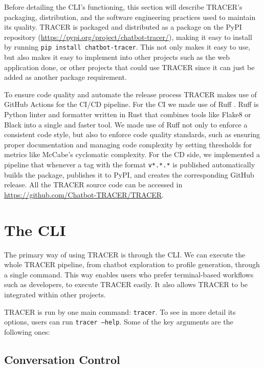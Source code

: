 Before detailing the \ac{CLI}'s functioning,
this section will describe \ac{TRACER}'s packaging, distribution,
and the software engineering practices used to maintain its quality.
\ac{TRACER} is packaged and distributed as a package on the \acf{PyPI} repository
(\url{https://pypi.org/project/chatbot-tracer/}),
making it easy to install by running
\texttt{pip install chatbot-tracer}.
This not only makes it easy to use,
but also makes it easy to implement into other projects
such as the web application done,
or other projects that could use \ac{TRACER}
since it can just be added as another package requirement.

To ensure code quality and automate the release process
\ac{TRACER} makes use of GitHub Actions for the \ac{CI/CD} pipeline.
For the \ac{CI} we made use of Ruff \autocite{Ruff}.
Ruff is Python linter and formatter written in Rust
that combines tools like Flake8 or Black into a single and faster tool.
We made use of Ruff not only to enforce a consistent code style,
but also to enforce code quality standards,
such as ensuring proper documentation
and managing code complexity by setting thresholds for metrics like McCabe's cyclomatic complexity.
For the \ac{CD} side,
we implemented a pipeline that whenever a tag with the format \texttt{v*.*.*} is published
automatically builds the package,
publishes it to \ac{PyPI},
and creates the corresponding GitHub release.
All the \ac{TRACER} source code can be accessed in \url{https://github.com/Chatbot-TRACER/TRACER}.

\section{The \acl{CLI}}

The primary way of using \ac{TRACER} is through the \ac{CLI}.
We can execute the whole \ac{TRACER} pipeline,
from chatbot exploration to profile generation,
through a single command.
This way enables users who prefer terminal-based workflows
such as developers, to execute TRACER easily.
It also allows \ac{TRACER} to be integrated within other projects.

\ac{TRACER} is run by one main command: \texttt{tracer}.
To see in more detail its options, users can run \texttt{tracer --help}.
Some of the key arguments are the following ones:

\subsection{Conversation Control}

